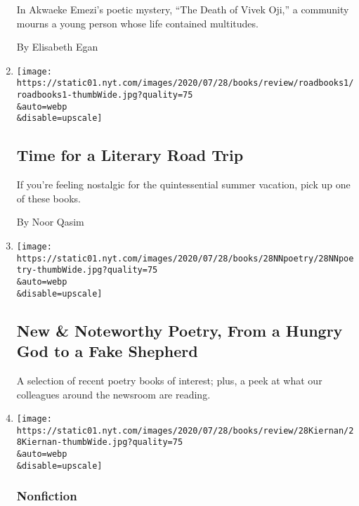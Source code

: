 \begin{enumerate}
  In Akwaeke Emezi's poetic mystery, ``The Death of Vivek Oji,'' a
  community mourns a young person whose life contained multitudes.

  By Elisabeth Egan
\item
  \href{/2020/07/28/books/time-for-a-literary-road-trip.html}{}

  \texttt{[image: https://static01.nyt.com/images/2020/07/28/books/review/roadbooks1/roadbooks1-thumbWide.jpg?quality=75\\\&auto=webp\\\&disable=upscale]}

  \hypertarget{time-for-a-literary-road-trip}{%
  \subsection{Time for a Literary Road
  Trip}\label{time-for-a-literary-road-trip}}

  If you're feeling nostalgic for the quintessential summer vacation,
  pick up one of these books.

  By Noor Qasim
\item
  \href{/2020/07/28/books/review/new-this-week.html}{}

  \texttt{[image: https://static01.nyt.com/images/2020/07/28/books/28NNpoetry/28NNpoetry-thumbWide.jpg?quality=75\\\&auto=webp\\\&disable=upscale]}

  \hypertarget{new--noteworthy-poetry-from-a-hungry-god-to-a-fake-shepherd}{%
  \subsection{New \& Noteworthy Poetry, From a Hungry God to a Fake
  Shepherd}\label{new--noteworthy-poetry-from-a-hungry-god-to-a-fake-shepherd}}

  A selection of recent poetry books of interest; plus, a peek at what
  our colleagues around the newsroom are reading.
\item
  \href{/2020/07/28/books/review/the-apocalypse-factory-steve-olson.html}{}

  \texttt{[image: https://static01.nyt.com/images/2020/07/28/books/review/28Kiernan/28Kiernan-thumbWide.jpg?quality=75\\\&auto=webp\\\&disable=upscale]}

  \hypertarget{nonfiction-2}{%
  \subsubsection{Nonfiction}\label{nonfiction-2}}

  \hypertarget{a-forgotten-town-at-the-center-of-the-manhattan-project}{%
}
\end{enumerate}
